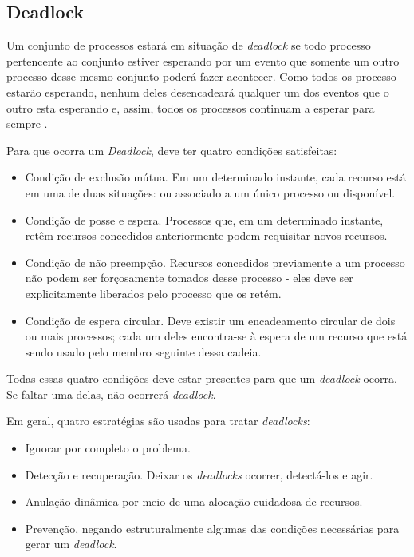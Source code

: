 \subsection{Deadlock}

Um conjunto de processos estará em situação de \textit{deadlock} se todo processo pertencente ao conjunto 
estiver esperando por um evento que somente um outro processo desse mesmo conjunto poderá fazer 
acontecer. Como todos os processo estarão esperando, nenhum deles desencadeará qualquer um dos 
eventos que o outro esta esperando e, assim, todos os processos continuam a esperar para sempre \cite{tanen}.

Para que ocorra um \textit{Deadlock}, deve ter quatro condições satisfeitas:

\begin{itemize}
\item Condição de exclusão mútua. Em um determinado instante, cada recurso está em uma de duas situações:
ou associado a um único processo ou disponível.
\item Condição de posse e espera. Processos que, em um determinado instante, retêm recursos concedidos
anteriormente podem requisitar novos recursos.
\item Condição de não preempção. Recursos concedidos previamente a um processo não podem ser 
forçosamente tomados desse processo - eles deve ser explicitamente liberados pelo processo que os retém.
\item Condição de espera circular. Deve existir um encadeamento circular de dois ou mais processos; cada um
deles encontra-se à espera de um recurso que está sendo usado pelo membro seguinte dessa cadeia.
\end{itemize}

Todas essas quatro condições deve estar presentes para que um \textit{deadlock} ocorra. Se faltar
uma delas, não ocorrerá \textit{deadlock}.

Em geral, quatro estratégias são usadas para tratar \textit{deadlocks}:

\begin{itemize}
\item Ignorar por completo o problema.
\item Detecção e recuperação. Deixar os \textit{deadlocks} ocorrer, detectá-los e agir.
\item Anulação dinâmica por meio de uma alocação cuidadosa de recursos.
\item Prevenção, negando estruturalmente algumas das condições necessárias para gerar um \textit{deadlock}.
\end{itemize}

